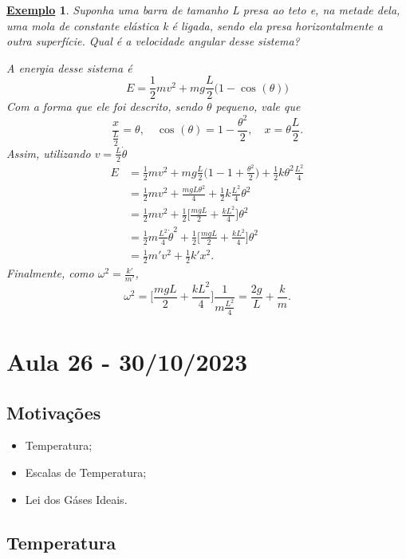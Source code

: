 \documentclass{article}
\newtheorem{example}{\underline{Exemplo}}
\begin{document}
\begin{example}
Suponha uma barra de tamanho L presa ao teto e, na metade dela, uma mola de constante elástica k é ligada, sendo ela presa horizontalmente a outra superfície.
Qual é a velocidade angular desse sistema?

  A energia desse sistema é 
  \[
    E = \frac{1}{2}mv^{2} + mg \frac{L}{2}\biggl(1-\cos^{}{(\theta )}\biggr)
  \]
  Com a forma que ele foi descrito, sendo \(\theta \) pequeno, vale que 
  \[
    \frac{x}{\frac{L}{2}} = \theta,\quad \cos^{}{(\theta )} = 1 -\frac{\theta^{2}}{2},\quad x = \theta \frac{L}{2}. 
  \]
  Assim, utilizando \(v = \frac{L}{2}\dot\theta \) 
  \begin{align*}
    E &= \frac{1}{2}mv^{2} + mg \frac{L}{2}\biggl(1 - 1 + \frac{\theta ^{2}}{2}\biggr) + \frac{1}{2}k\theta^{2}\frac{L^{2}}{4} \\
      &= \frac{1}{2}mv^{2} + \frac{mgL\theta ^{2}}{4} + \frac{1}{2}k \frac{L^{2}}{4}\theta^{2}\\
      &= \frac{1}{2}mv^{2} + \frac{1}{2}\biggl[\frac{mgL}{2} + \frac{kL^{2}}{4}\biggr]\theta^{2}\\
      &= \frac{1}{2}m \frac{L^{2}}{4}\dot \theta ^{2} + \frac{1}{2}\biggl[\frac{mgL}{2}+ \frac{kL^{2}}{4}\biggr]\theta^{2}\\
      &= \frac{1}{2}m'v^{2} + \frac{1}{2}k'x^{2}.
  \end{align*}
  Finalmente, como \(\omega^{2} = \frac{k'}{m'}\), 
    \[
      \omega^{2} = \biggl[\frac{mgL}{2}+ \frac{kL^{2}}{4}\biggr]\frac{1}{m \frac{L^{2}}{4}} = \frac{2g}{L} + \frac{k}{m}.
    \]
\end{example}
\newpage

\section{Aula 26 - 30/10/2023}
\subsection{Motivações} 
\begin{itemize}
  \item Temperatura;
  \item Escalas de Temperatura;
  \item Lei dos Gáses Ideais.
\end{itemize}
\subsection{Temperatura}
\end{document}
